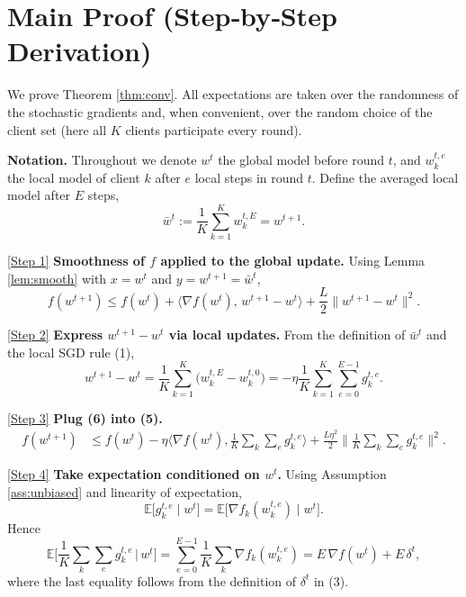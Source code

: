 \documentclass{article}
\newcommand{\E}{\mathbb{E}}
\begin{document}
\section*{Main Proof (Step‑by‑Step Derivation)}
We prove Theorem \ref{thm:conv}.  All expectations are taken over the randomness of the stochastic gradients and, when convenient, over the random choice of the client set (here all $K$ clients participate every round).

\medskip
\noindent\textbf{Notation.} Throughout we denote $w^{t}$ the global model before round $t$, and $w_{k}^{t,e}$ the local model of client $k$ after $e$ local steps in round $t$.  Define the averaged local model after $E$ steps,
\[
\bar w^{t}:=\frac1K\sum_{k=1}^{K} w_{k}^{t,E}=w^{t+1}.
\]

\medskip
\noindent\underline{[Step 1]} \textbf{Smoothness of $f$ applied to the global update.}  
Using Lemma \ref{lem:smooth} with $x=w^{t}$ and $y=w^{t+1}=\bar w^{t}$,
\[
f(w^{t+1})\le f(w^{t})+\langle\nabla f(w^{t}),\,w^{t+1}-w^{t}\rangle+\frac{L}{2}\|w^{t+1}-w^{t}\|^{2}. \tag{5}
\]

\medskip
\noindent\underline{[Step 2]} \textbf{Express $w^{t+1}-w^{t}$ via local updates.}  
From the definition of $\bar w^{t}$ and the local SGD rule (1),
\[
w^{t+1}-w^{t}= \frac1K\sum_{k=1}^{K}\bigl(w_{k}^{t,E}-w_{k}^{t,0}\bigr)
 = -\eta\frac1K\sum_{k=1}^{K}\sum_{e=0}^{E-1} g_{k}^{t,e}. \tag{6}
\]

\medskip
\noindent\underline{[Step 3]} \textbf{Plug (6) into (5).}  
\[
\begin{aligned}
f(w^{t+1}) &\le f(w^{t}) -\eta\Big\langle\nabla f(w^{t}),\frac1K\sum_{k}\sum_{e} g_{k}^{t,e}\Big\rangle
 +\frac{L\eta^{2}}{2}\Big\|\frac1K\sum_{k}\sum_{e} g_{k}^{t,e}\Big\|^{2}.
\end{aligned} \tag{7}
\]

\medskip
\noindent\underline{[Step 4]} \textbf{Take expectation conditioned on $w^{t}$.}  
Using Assumption \ref{ass:unbiased} and linearity of expectation,
\[
\E\!\bigl[g_{k}^{t,e}\mid w^{t}\bigr]=\E\!\bigl[\nabla f_k(w_{k}^{t,e})\mid w^{t}\bigr].
\]
Hence
\[
\E\!\Big[\frac1K\sum_{k}\sum_{e} g_{k}^{t,e}\,\Big|\,w^{t}\Big]
 = \sum_{e=0}^{E-1}\frac1K\sum_{k}\nabla f_k(w_{k}^{t,e})
 = E\,\nabla f(w^{t}) + E\,\delta^{t}, \tag{8}
\]
where the last equality follows from the definition of $\delta^{t}$ in (3).
\end{document}
